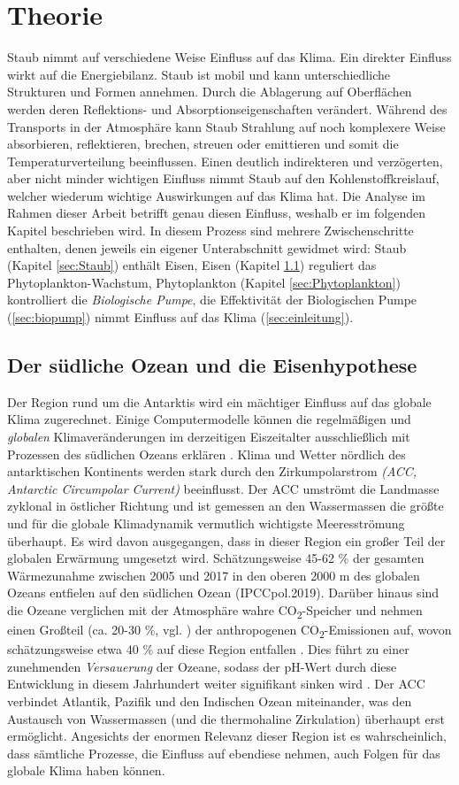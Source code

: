 \documentclass[12pt,a4paper,onecolumn]{scrartcl}
\newcommand{\cotwo}{CO\textsubscript{2}}
\begin{document}
\section{Theorie} \label{sec:Theorie}
Staub nimmt auf verschiedene Weise Einfluss auf das Klima. Ein direkter Einfluss wirkt auf die Energiebilanz. Staub ist mobil und kann unterschiedliche Strukturen und Formen annehmen. Durch die Ablagerung auf Oberflächen werden deren Reflektions- und Absorptionseigenschaften verändert. Während des Transports in der Atmosphäre kann Staub Strahlung auf noch komplexere Weise absorbieren, reflektieren, brechen, streuen oder emittieren \citep{Shao.2011} und somit die Temperaturverteilung beeinflussen. Einen deutlich indirekteren und verzögerten, aber nicht minder wichtigen Einfluss nimmt Staub auf den Kohlenstoffkreislauf, welcher wiederum wichtige Auswirkungen auf das Klima hat. Die Analyse im Rahmen dieser Arbeit betrifft genau diesen Einfluss, weshalb er im folgenden Kapitel beschrieben wird. In diesem Prozess sind mehrere Zwischenschritte enthalten, denen jeweils ein eigener Unterabschnitt gewidmet wird: Staub (Kapitel \ref{sec:Staub}) enthält Eisen, Eisen (Kapitel \ref{sec:Eisenhypothese}) reguliert das Phytoplankton-Wachstum, Phytoplankton (Kapitel \ref{sec:Phytoplankton}) kontrolliert die \textit{Biologische Pumpe}, die Effektivität der Biologischen Pumpe (\ref{sec:biopump}) nimmt Einfluss auf das Klima (\ref{sec:einleitung}).
\subsection{Der südliche Ozean und die Eisenhypothese} \label{sec:Eisenhypothese}
Der Region rund um die Antarktis wird ein mächtiger Einfluss auf das globale Klima zugerechnet. Einige Computermodelle können die regelmäßigen und \textit{globalen} Klimaveränderungen im derzeitigen Eiszeitalter ausschließlich mit Prozessen des südlichen Ozeans erklären \citep{Fischer.2010}. Klima und Wetter nördlich des antarktischen Kontinents werden stark durch den Zirkumpolarstrom \textit{(ACC, Antarctic Circumpolar Current)} beeinflusst. Der ACC umströmt die Landmasse zyklonal in östlicher Richtung und ist gemessen an den Wassermassen die größte und für die globale Klimadynamik vermutlich wichtigste Meeresströmung überhaupt. Es wird davon ausgegangen, dass in dieser Region ein großer Teil der globalen Erwärmung umgesetzt wird. Schätzungsweise 45-62 \% der gesamten Wärmezunahme zwischen 2005 und 2017 in den oberen 2000 m des globalen Ozeans entfielen auf den südlichen Ozean (IPCCpol.2019). Darüber hinaus sind die Ozeane verglichen mit der Atmosphäre wahre \cotwo -Speicher und nehmen einen Großteil (ca. 20-30 \%, vgl. \cite{IPCCpol.2019}) der anthropogenen \cotwo -Emissionen auf, wovon schätzungsweise etwa 40 \% auf diese Region entfallen \citep{Boning.2008}. Dies führt zu einer zunehmenden \textit{Versauerung} der Ozeane, sodass der pH-Wert durch diese Entwicklung in diesem Jahrhundert weiter signifikant sinken wird \citep{IPCCpol.2019}. Der ACC verbindet Atlantik, Pazifik und den Indischen Ozean miteinander, was den Austausch von Wassermassen (und die thermohaline Zirkulation) überhaupt erst ermöglicht. Angesichts der enormen Relevanz dieser Region ist es wahrscheinlich, dass sämtliche Prozesse, die Einfluss auf ebendiese nehmen, auch Folgen für das globale Klima haben können.
\end{document}
